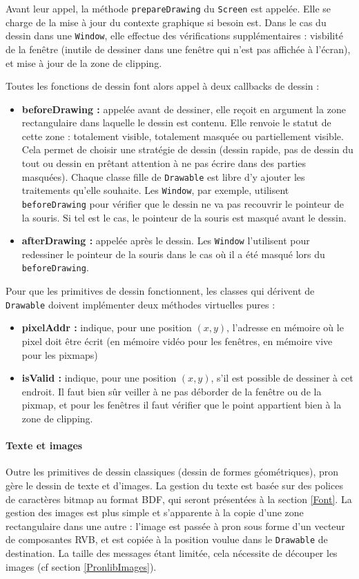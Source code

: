 Avant leur appel, la méthode \verb|prepareDrawing| du \verb|Screen| est appelée. Elle se charge de la mise à jour du contexte graphique si besoin est. Dans le cas du dessin dans une \verb|Window|, elle effectue des vérifications supplémentaires : visbilité de la fenêtre (inutile de dessiner dans une fenêtre qui n'est pas affichée à l'écran), et mise à jour de la zone de clipping.

Toutes les fonctions de dessin font alors appel à deux callbacks de dessin :
\begin{itemize}
  \item \textbf{beforeDrawing :} appelée avant de dessiner, elle reçoit en argument la zone rectangulaire dans laquelle le dessin est contenu. Elle renvoie le statut de cette zone : totalement visible, totalement masquée ou partiellement visible. Cela permet de choisir une stratégie de dessin (dessin rapide, pas de dessin du tout ou dessin en prêtant attention à ne pas écrire dans des parties masquées). Chaque classe fille de \verb|Drawable| est libre d'y ajouter les traitements qu'elle souhaite. Les \verb|Window|, par exemple, utilisent \verb|beforeDrawing| pour vérifier que le dessin ne va pas recouvrir le pointeur de la souris. Si tel est le cas, le pointeur de la souris est masqué avant le dessin.
  \item \textbf{afterDrawing :} appelée après le dessin. Les \verb|Window| l'utilisent pour redessiner le pointeur de la souris dans le cas où il a été masqué lors du \verb|beforeDrawing|.
\end{itemize}

\vspace{1em}

Pour que les primitives de dessin fonctionnent, les classes qui dérivent de \verb|Drawable| doivent implémenter deux méthodes virtuelles pures :
\begin{itemize}
  \item \textbf{pixelAddr :} indique, pour une position $(x, y)$, l'adresse en mémoire où le pixel doit être écrit (en mémoire vidéo pour les fenêtres, en mémoire vive pour les pixmaps)
  \item \textbf{isValid :} indique, pour une position $(x, y)$, s'il est possible de dessiner à cet endroit. Il faut bien sûr veiller à ne pas déborder de la fenêtre ou de la pixmap, et pour les fenêtres il faut vérifier que le point appartient bien à la zone de clipping.
\end{itemize}

\paragraph{Texte et images}
Outre les primitives de dessin classiques (dessin de formes géométriques), pron gère le dessin de texte et d'images. La gestion du texte est basée sur des polices de caractères bitmap au format BDF, qui seront présentées à la section \ref{Font}. La gestion des images est plus simple et s'apparente à la copie d'une zone rectangulaire dans une autre : l'image est passée à pron sous forme d'un vecteur de composantes RVB, et est copiée à la position voulue dans le \verb|Drawable| de destination. La taille des messages étant limitée, cela nécessite de découper les images (cf section \ref{PronlibImages}).

